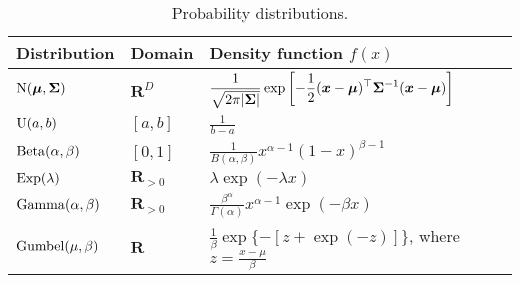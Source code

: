 \begin{table}
  \caption{Probability distributions.}
  \label{fr:tab:distributions}
  \centering
  \begin{tabular}{lll}
    \toprule
    Distribution & Domain & Density function $f(x)$ \\
    \midrule
    \addlinespace
    $\mathrm{N}( \bm{\mu}, \bm{\Sigma} )$
        & $\mathbf{R}^D$
        & $\displaystyle \frac{1}{\sqrt{2 \pi \lvert\bm{\Sigma}\rvert}}
          \exp \left[ -\frac{1}{2} (\bm{x} - \bm{\mu})^\top \bm{\Sigma}^{-1} (\bm{x} - \bm{\mu}) \right]$ \\
    \addlinespace
    $\mathrm{U}( a, b )$
        & $[a, b]$
        & $\displaystyle \frac{1}{b - a}$ \\
    \addlinespace
    $\mathrm{Beta}( \alpha, \beta )$
        & $[0, 1]$
        & $\displaystyle \frac{1}{B(\alpha, \beta)} x^{\alpha - 1} (1-x)^{\beta - 1}$ \\
    \addlinespace
    $\mathrm{Exp}( \lambda )$
        & $\mathbf{R}_{>0}$
        & $\displaystyle \lambda \exp(- \lambda x)$ \\
    \addlinespace
    $\mathrm{Gamma}( \alpha, \beta )$
        & $\mathbf{R}_{>0}$
        & $\displaystyle \frac{\beta^\alpha}{\Gamma(\alpha)} x^{\alpha-1} \exp(- \beta x)$ \\
    \addlinespace
    $\mathrm{Gumbel}( \mu, \beta )$
        & $\mathbf{R}$
        & $\displaystyle \frac{1}{\beta} \exp \{ - [z + \exp(-z)]\}$, where $\displaystyle z = \frac{x - \mu}{\beta}$ \\
    \bottomrule
  \end{tabular}
\end{table}
